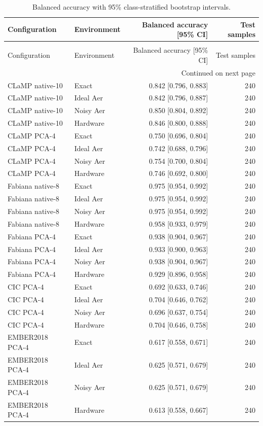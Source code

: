 \begin{longtable}{llrr}
\caption{Balanced accuracy with 95\% class-stratified bootstrap intervals.} \label{tab:balanced-accuracy-intervals} \\
\toprule
Configuration & Environment & Balanced accuracy [95\% CI] & Test samples \\
\midrule
\endfirsthead
\caption[]{Balanced accuracy with 95\% class-stratified bootstrap intervals.} \\
\toprule
Configuration & Environment & Balanced accuracy [95\% CI] & Test samples \\
\midrule
\endhead
\midrule
\multicolumn{4}{r}{Continued on next page} \\
\midrule
\endfoot
\bottomrule
\endlastfoot
CLaMP native-10 & Exact & 0.842 [0.796, 0.883] & 240 \\
CLaMP native-10 & Ideal Aer & 0.842 [0.796, 0.887] & 240 \\
CLaMP native-10 & Noisy Aer & 0.850 [0.804, 0.892] & 240 \\
CLaMP native-10 & Hardware & 0.846 [0.800, 0.888] & 240 \\
CLaMP PCA-4 & Exact & 0.750 [0.696, 0.804] & 240 \\
CLaMP PCA-4 & Ideal Aer & 0.742 [0.688, 0.796] & 240 \\
CLaMP PCA-4 & Noisy Aer & 0.754 [0.700, 0.804] & 240 \\
CLaMP PCA-4 & Hardware & 0.746 [0.692, 0.800] & 240 \\
Fabiana native-8 & Exact & 0.975 [0.954, 0.992] & 240 \\
Fabiana native-8 & Ideal Aer & 0.975 [0.954, 0.992] & 240 \\
Fabiana native-8 & Noisy Aer & 0.975 [0.954, 0.992] & 240 \\
Fabiana native-8 & Hardware & 0.958 [0.933, 0.979] & 240 \\
Fabiana PCA-4 & Exact & 0.938 [0.904, 0.967] & 240 \\
Fabiana PCA-4 & Ideal Aer & 0.933 [0.900, 0.963] & 240 \\
Fabiana PCA-4 & Noisy Aer & 0.938 [0.904, 0.967] & 240 \\
Fabiana PCA-4 & Hardware & 0.929 [0.896, 0.958] & 240 \\
CIC PCA-4 & Exact & 0.692 [0.633, 0.746] & 240 \\
CIC PCA-4 & Ideal Aer & 0.704 [0.646, 0.762] & 240 \\
CIC PCA-4 & Noisy Aer & 0.696 [0.637, 0.754] & 240 \\
CIC PCA-4 & Hardware & 0.704 [0.646, 0.758] & 240 \\
EMBER2018 PCA-4 & Exact & 0.617 [0.558, 0.671] & 240 \\
EMBER2018 PCA-4 & Ideal Aer & 0.625 [0.571, 0.679] & 240 \\
EMBER2018 PCA-4 & Noisy Aer & 0.625 [0.571, 0.679] & 240 \\
EMBER2018 PCA-4 & Hardware & 0.613 [0.558, 0.667] & 240 \\
\end{longtable}
